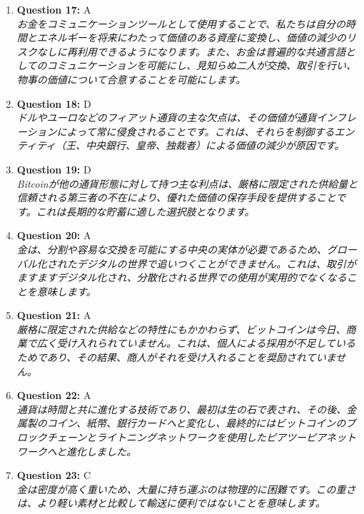 \documentclass[12pt,a4paper]{article}
\begin{document}
\begin{enumerate}
\item \textbf{Question 17:} A
\\ \textit{お金をコミュニケーションツールとして使用することで、私たちは自分の時間とエネルギーを将来にわたって価値のある資産に変換し、価値の減少のリスクなしに再利用できるようになります。また、お金は普遍的な共通言語としてのコミュニケーションを可能にし、見知らぬ二人が交換、取引を行い、物事の価値について合意することを可能にします。}

\item \textbf{Question 18:} D
\\ \textit{ドルやユーロなどのフィアット通貨の主な欠点は、その価値が通貨インフレーションによって常に侵食されることです。これは、それらを制御するエンティティ（王、中央銀行、皇帝、独裁者）による価値の減少が原因です。}

\item \textbf{Question 19:} D
\\ \textit{Bitcoinが他の通貨形態に対して持つ主な利点は、厳格に限定された供給量と信頼される第三者の不在により、優れた価値の保存手段を提供することです。これは長期的な貯蓄に適した選択肢となります。}

\item \textbf{Question 20:} A
\\ \textit{金は、分割や容易な交換を可能にする中央の実体が必要であるため、グローバル化されたデジタルの世界で追いつくことができません。これは、取引がますますデジタル化され、分散化される世界での使用が実用的でなくなることを意味します。}

\item \textbf{Question 21:} A
\\ \textit{厳格に限定された供給などの特性にもかかわらず、ビットコインは今日、商業で広く受け入れられていません。これは、個人による採用が不足しているためであり、その結果、商人がそれを受け入れることを奨励されていません。}

\item \textbf{Question 22:} A
\\ \textit{通貨は時間と共に進化する技術であり、最初は生の石で表され、その後、金属製のコイン、紙幣、銀行カードへと変化し、最終的にはビットコインのブロックチェーンとライトニングネットワークを使用したピアツーピアネットワークへと進化しました。}

\item \textbf{Question 23:} C
\\ \textit{金は密度が高く重いため、大量に持ち運ぶのは物理的に困難です。この重さは、より軽い素材と比較して輸送に便利ではないことを意味します。}


\end{enumerate}
\end{document}
